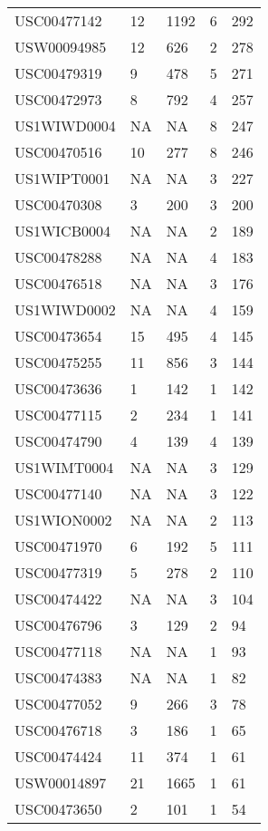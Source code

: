 \begin{center}
\begin{longtable}{l l l l l}
				  USC00477142 &  12 & 1192 &   6 & 292 \\ 
				  USW00094985 &  12 & 626 &   2 & 278 \\ 
				  USC00479319 &   9 & 478 &   5 & 271 \\ 
				  USC00472973 &   8 & 792 &   4 & 257 \\ 
				  US1WIWD0004 & NA & NA &   8 & 247 \\ 
				  USC00470516 &  10 & 277 &   8 & 246 \\ 
				  US1WIPT0001 & NA & NA &   3 & 227 \\ 
				  USC00470308 &   3 & 200 &   3 & 200 \\ 
				  US1WICB0004 & NA & NA &   2 & 189 \\ 
				  USC00478288 & NA & NA &   4 & 183 \\ 
				  USC00476518 & NA & NA &   3 & 176 \\ 
				  US1WIWD0002 & NA & NA &   4 & 159 \\ 
				  USC00473654 &  15 & 495 &   4 & 145 \\ 
				  USC00475255 &  11 & 856 &   3 & 144 \\ 
				  USC00473636 &   1 & 142 &   1 & 142 \\ 
				  USC00477115 &   2 & 234 &   1 & 141 \\ 
				  USC00474790 &   4 & 139 &   4 & 139 \\ 
				  US1WIMT0004 & NA & NA &   3 & 129 \\ 
				  USC00477140 & NA & NA &   3 & 122 \\ 
				  US1WION0002 & NA & NA &   2 & 113 \\ 
				  USC00471970 &   6 & 192 &   5 & 111 \\ 
				  USC00477319 &   5 & 278 &   2 & 110 \\ 
				  USC00474422 & NA & NA &   3 & 104 \\ 
				  USC00476796 &   3 & 129 &   2 &  94 \\ 
				  USC00477118 & NA & NA &   1 &  93 \\ 
				  USC00474383 & NA & NA &   1 &  82 \\ 
				  USC00477052 &   9 & 266 &   3 &  78 \\ 
				  USC00476718 &   3 & 186 &   1 &  65 \\ 
				  USC00474424 &  11 & 374 &   1 &  61 \\ 
				  USW00014897 &  21 & 1665 &   1 &  61 \\ 
				  USC00473650 &   2 & 101 &   1 &  54 \\ 

\end{longtable}
\end{center}
